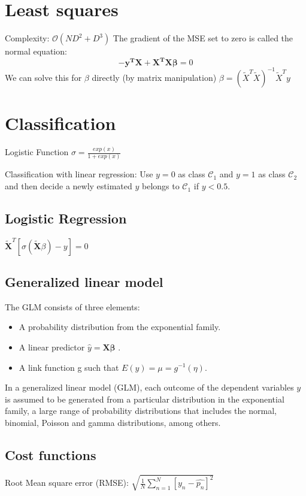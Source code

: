 \documentclass[10pt,a4paper,landscape]{article}
\providecommand{\bf}[1]{\ensuremath{\mathbf{#1}}}
\begin{document}
\begin{multicols*}{4}
\section{Least squares}
Complexity: $\mathcal{O}(ND^2 + D^3)$
The gradient of the MSE set to zero is called the normal equation:
$$ - \bf{y^T X} + \bf{X^T X \beta} = 0$$
We can solve this for $\beta$ directly (by matrix manipulation)
$\beta = ( \tilde{X}^T \tilde{X} )^{-1} \tilde{X}^T y$

\section{Classification}
Logistic Function $\sigma = \frac{exp(x)}{1+exp(x)}$

Classification with linear regression: Use $y = 0$ as class $\mathcal{C_1}$
and $y = 1$ as class $\mathcal{C_2}$ and then decide a newly estimated $y$ belongs
to $\mathcal{C_1}$ if $y < 0.5$.

\subsection{Logistic Regression}
$\tilde{\bf{X}}^T [\sigma(\tilde{\bf{X}} \beta) - y] = 0$

\subsection{Generalized linear model}
The GLM consists of three elements:
\begin{itemize}
  \item A probability distribution from the exponential family.
  \item A linear predictor $\hat y = \bf{X} \bf{\beta}$ .
  \item A link function g such that $E(y) = \mu = g^{-1}(\eta)$.
\end{itemize}

In a generalized linear model (GLM), each outcome of the dependent variables $y$ is assumed to be generated from a particular distribution in the exponential family, a large range of probability distributions that includes the normal, binomial, Poisson and gamma distributions, among others.


\subsection{Cost functions}
Root Mean square error (RMSE): $\sqrt{\frac{1}{N} \sum_{n=1}^{N}\left[y_n- \hat{p_n} \right]^2}$


\end{multicols*}
\end{document}
